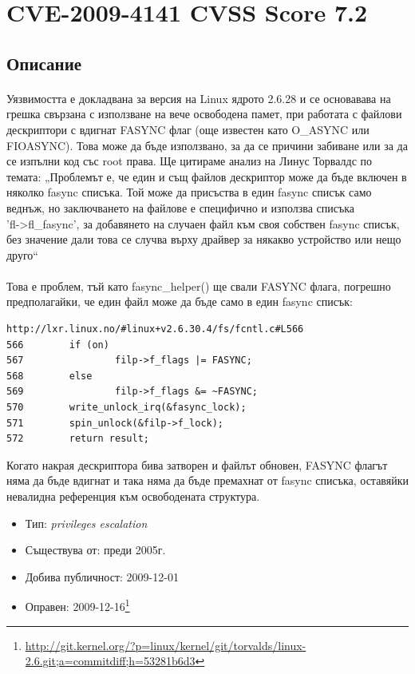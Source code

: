 \documentclass[a4paper,12pt,leqno]{article}
\begin{document}
\section{CVE-2009-4141 CVSS Score 7.2}
\subsection{Описание}
\paragraph{}
Уязвимостта е докладвана за версия на Linux ядрото 2.6.28 и се основавава на 
грешка свързана с  използване на вече освободена памет, при работата с 
файлови дескриптори с вдигнат FASYNC флаг (още известен като O\_ASYNC или 
FIOASYNC). Това може да бъде използвано, за да се причини забиване или за 
да се изпълни код със root права. Ще цитираме анализ на Линус Торвалдс по 
темата: „Проблемът е, че един и същ файлов дескриптор може да бъде 
включен в няколко fasync списъка. Той може да присъства в един fasync списък 
само веднъж, но заключването на файлове е специфично и използва списъка 
\\'fl->fl\_fasync', за добавянето на случаен файл към своя собствен fasync списък, 
без значение дали това се случва върху драйвер за някакво устройство или 
нещо друго“ 
\paragraph{}
Това е проблем, тъй като fasync\_helper() ще свали FASYNC флага, погрешно 
предполагайки, че един файл може да бъде само в един fasync списък:

\begin{verbatim}
http://lxr.linux.no/#linux+v2.6.30.4/fs/fcntl.c#L566
566        if (on)
567                filp->f_flags |= FASYNC;
568        else
569                filp->f_flags &= ~FASYNC;
570        write_unlock_irq(&fasync_lock);
571        spin_unlock(&filp->f_lock);
572        return result;
\end{verbatim}
Когато накрая дескриптора бива затворен и файлът обновен, FASYNC флагът 
няма да бъде вдигнат и така няма да бъде премахнат от fasync списъка, 
оставяйки невалидна референция към освободената структура.

\begin{itemize}
    \item Тип: \textit{privileges escalation}
    \item Съществува от: преди 2005г.
  	\item Добива публичност: 2009-12-01
    \item Оправен: 2009-12-16\footnote{\url{http://git.kernel.org/?p=linux/kernel/git/torvalds/linux-2.6.git;a=commitdiff;h=53281b6d3}}
\end{itemize}
\end{document}
